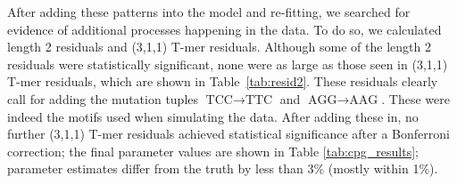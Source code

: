 \documentclass{article}
\newcommand{\nA}{\mbox{A}}  %
\newcommand{\nC}{\mbox{C}}
\newcommand{\nG}{\mbox{G}}
\newcommand{\nT}{\mbox{T}}
\theoremstyle{plain}
\theoremstyle{definition}
\begin{document}
After adding these patterns into the model and re-fitting, we searched for evidence of additional processes happening in the data.
To do so, we calculated length 2 residuals and (3,1,1) T-mer residuals.
Although some of the length 2 residuals were statistically significant,
none were as large as those seen in (3,1,1) T-mer residuals, which are shown in Table~\ref{tab:resid2}.
These residuals clearly call for adding the mutation tuples $\nT\nC\nC \to \nT\nT\nC$ and $\nA\nG\nG \to \nA\nA\nG$.
These were indeed the motifs used when simulating the data.
After adding these in,
no further (3,1,1) T-mer residuals achieved
statistical significance after a Bonferroni correction;
the final parameter values are shown in Table \ref{tab:cpg_results};
parameter estimates differ from the truth by less than 3\% (mostly within 1\%).
\end{document}
